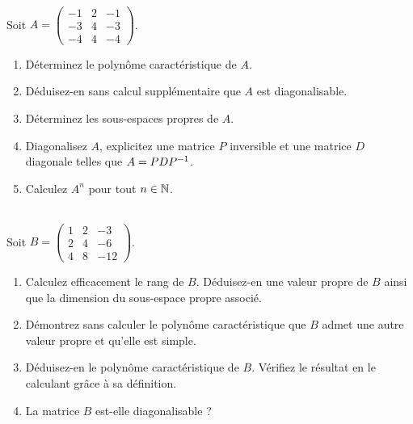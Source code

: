 \begin{exos}[Exercice 8]~\\
Soit \(A=\begin{pmatrix}
-1 & 2 & -1 \\
-3 & 4 & -3 \\
-4 & 4 & -4
\end{pmatrix}\).

\begin{enumerate}
    \item Déterminez le polynôme caractéristique de \(A\). \\
    \item Déduisez-en sans calcul supplémentaire que \(A\) est diagonalisable. \\
    \item Déterminez les sous-espaces propres de \(A\). \\
    \item Diagonalisez \(A\), \cad explicitez une matrice \(P\) inversible et une matrice \(D\) diagonale telles que \(A=PDP^{-1}\). \\
    \item Calculez \(A^n\) pour tout \(n\in\mathbb{N}\).
\end{enumerate}
\end{exos}



\begin{exos}~\\
Soit \(B=\begin{pmatrix}
1 & 2 & -3 \\
2 & 4 & -6 \\
4 & 8 & -12
\end{pmatrix}\).

\begin{enumerate}
    \item Calculez efficacement le rang de \(B\). Déduisez-en une valeur propre de \(B\) ainsi que la dimension du sous-espace propre associé. \\
    \item Démontrez sans calculer le polynôme caractéristique que \(B\) admet une autre valeur propre et qu'elle est simple. \\
    \item Déduisez-en le polynôme caractéristique de \(B\). Vérifiez le résultat en le calculant grâce à sa définition. \\
    \item La matrice \(B\) est-elle diagonalisable ?
\end{enumerate}
\end{exos}



